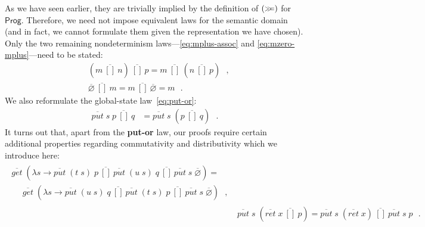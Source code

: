 \documentclass{llncs}
\newcommand{\Conid}[1]{\mathit{#1}}
\newcommand{\Varid}[1]{\mathit{#1}}
\let\Varid\mathit
\let\Conid\mathsf
\begin{document}
As we have seen earlier, they are trivially implied by the definition of \ensuremath{(\mathrel{\hstretch{0.7}{>\!\!>\!\!=}})}
for \ensuremath{\Conid{Prog}}. Therefore, we need not impose equivalent laws for the semantic
domain (and in fact, we cannot formulate them given the representation we
have chosen).
Only the two remaining nondeterminism
laws---\eqref{eq:mplus-assoc} and \eqref{eq:mzero-mplus}---need to be stated:
\begin{align}
  &\ensuremath{(\Varid{m}~\overline{[\!]}~\Varid{n})~\overline{[\!]}~\Varid{p}} = \ensuremath{\Varid{m}~\overline{[\!]}~(\Varid{n}~\overline{[\!]}~\Varid{p})} \mbox{~~,} \\
  &\ensuremath{\overline{\Varid{\varnothing}}~\overline{[\!]}~\Varid{m}} = \ensuremath{\Varid{m}~\overline{[\!]}~\overline{\Varid{\varnothing}}} = \ensuremath{\Varid{m}} \mbox{~~.}
\end{align}
We also reformulate the global-state law~\eqref{eq:put-or}:
\begin{align}
\ensuremath{\overline{\Varid{put}}\;\Varid{s}\;\Varid{p}~\overline{[\!]}~\Varid{q}}        &= \ensuremath{\overline{\Varid{put}}\;\Varid{s}\;(\Varid{p}~\overline{[\!]}~\Varid{q})} \mbox{~~.}\label{eq:put-or-g-d}
\end{align}
It turns out that, apart from the {\bf put-or} law,
our proofs require certain additional properties regarding commutativity and
distributivity which we introduce here:
\begin{align}
\begin{split}
\ensuremath{\overline{\Varid{get}}\;(\lambda \Varid{s}\to \overline{\Varid{put}}\;(\Varid{t}\;\Varid{s})\;\Varid{p}~\overline{[\!]}~\overline{\Varid{put}}\;(\Varid{u}\;\Varid{s})\;\Varid{q}~\overline{[\!]}~\overline{\Varid{put}}\;\Varid{s}\;\overline{\Varid{\varnothing}})} = \\
~~~~~~\ensuremath{\overline{\Varid{get}}\;(\lambda \Varid{s}\to \overline{\Varid{put}}\;(\Varid{u}\;\Varid{s})\;\Varid{q}~\overline{[\!]}~\overline{\Varid{put}}\;(\Varid{t}\;\Varid{s})\;\Varid{p}~\overline{[\!]}~\overline{\Varid{put}}\;\Varid{s}\;\overline{\Varid{\varnothing}})} \mbox {~~,}
\end{split} \label{eq:put-or-comm-g-d} \\
& \ensuremath{\overline{\Varid{put}}\;\Varid{s}\;(\overline{\Varid{ret}}\;\Varid{x}~\overline{[\!]}~\Varid{p})} = \ensuremath{\overline{\Varid{put}}\;\Varid{s}\;(\overline{\Varid{ret}}\;\Varid{x})~\overline{[\!]}~\overline{\Varid{put}}\;\Varid{s}\;\Varid{p}} \mbox{~~.}\label{eq:put-ret-or-g-d}
\end{align}
\end{document}
